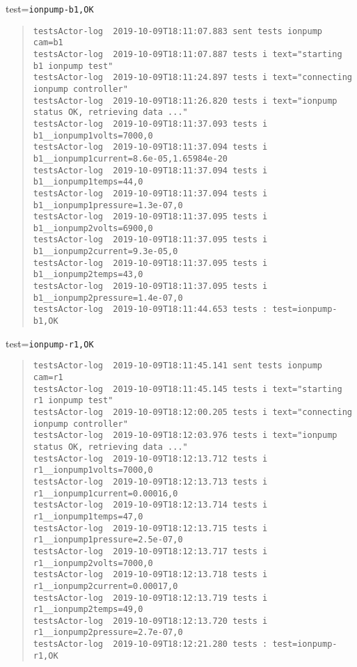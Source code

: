 test=\texttt{ionpump-b1,OK}

\begin{quote}
\begin{tiny}
\begin{verbatim}
testsActor-log  2019-10-09T18:11:07.883 sent tests ionpump cam=b1
testsActor-log  2019-10-09T18:11:07.887 tests i text="starting b1 ionpump test"
testsActor-log  2019-10-09T18:11:24.897 tests i text="connecting ionpump controller"
testsActor-log  2019-10-09T18:11:26.820 tests i text="ionpump status OK, retrieving data ..."
testsActor-log  2019-10-09T18:11:37.093 tests i b1__ionpump1volts=7000,0
testsActor-log  2019-10-09T18:11:37.094 tests i b1__ionpump1current=8.6e-05,1.65984e-20
testsActor-log  2019-10-09T18:11:37.094 tests i b1__ionpump1temps=44,0
testsActor-log  2019-10-09T18:11:37.094 tests i b1__ionpump1pressure=1.3e-07,0
testsActor-log  2019-10-09T18:11:37.095 tests i b1__ionpump2volts=6900,0
testsActor-log  2019-10-09T18:11:37.095 tests i b1__ionpump2current=9.3e-05,0
testsActor-log  2019-10-09T18:11:37.095 tests i b1__ionpump2temps=43,0
testsActor-log  2019-10-09T18:11:37.095 tests i b1__ionpump2pressure=1.4e-07,0
testsActor-log  2019-10-09T18:11:44.653 tests : test=ionpump-b1,OK
\end{verbatim}
\end{tiny}
\end{quote}

\noindent test=\texttt{ionpump-r1,OK}

\begin{quote}
\begin{tiny}
\begin{verbatim}
testsActor-log  2019-10-09T18:11:45.141 sent tests ionpump cam=r1
testsActor-log  2019-10-09T18:11:45.145 tests i text="starting r1 ionpump test"
testsActor-log  2019-10-09T18:12:00.205 tests i text="connecting ionpump controller"
testsActor-log  2019-10-09T18:12:03.976 tests i text="ionpump status OK, retrieving data ..."
testsActor-log  2019-10-09T18:12:13.712 tests i r1__ionpump1volts=7000,0
testsActor-log  2019-10-09T18:12:13.713 tests i r1__ionpump1current=0.00016,0
testsActor-log  2019-10-09T18:12:13.714 tests i r1__ionpump1temps=47,0
testsActor-log  2019-10-09T18:12:13.715 tests i r1__ionpump1pressure=2.5e-07,0
testsActor-log  2019-10-09T18:12:13.717 tests i r1__ionpump2volts=7000,0
testsActor-log  2019-10-09T18:12:13.718 tests i r1__ionpump2current=0.00017,0
testsActor-log  2019-10-09T18:12:13.719 tests i r1__ionpump2temps=49,0
testsActor-log  2019-10-09T18:12:13.720 tests i r1__ionpump2pressure=2.7e-07,0
testsActor-log  2019-10-09T18:12:21.280 tests : test=ionpump-r1,OK
\end{verbatim}
\end{tiny}
\end{quote}

